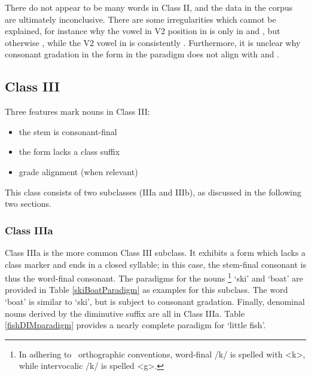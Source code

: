 There do not appear to be many words in Class II, and the data in the corpus are ultimately inconclusive. %
There are some irregularities which cannot be explained, for instance 
why the vowel in V2 position in  is only  in  and , but otherwise , while the V2 vowel in  is consistently . Furthermore, it is unclear why consonant gradation in the  form in the  paradigm does not align with  and . %


\FB


\subsection{Class III}\label{NclassIII}
Three features mark nouns in Class III: 
\begin{itemize}
\item{the stem is consonant-final}
\item{the  form lacks a class suffix}
\item{ grade alignment (when relevant)}
\end{itemize}
This class consists of two subclasses (IIIa and IIIb), as discussed in the following two sections. 


\subsubsection{Class IIIa}\label{NclassIIIa}
Class IIIa is the more common Class III subclass. It exhibits a  form which lacks a class marker and ends in a closed syllable; in this case, the stem-final consonant is thus the word-final consonant. 
The paradigms for the nouns \footnote{In adhering to \PS\ orthographic conventions, word-final /k/ is spelled with <k>, while intervocalic /k/ is spelled <g>.} 
‘ski’ and  ‘boat’ are provided in Table \vref{skiBoatParadigm} %
as examples for this subclass. %
The word  ‘boat’ is similar to  ‘ski’, but is subject to consonant gradation. %
Finally, denominal nouns derived by the diminutive suffix  are all in Class IIIa. Table \vref{fishDIMparadigm} provides a nearly complete paradigm for  ‘little fish’. 

